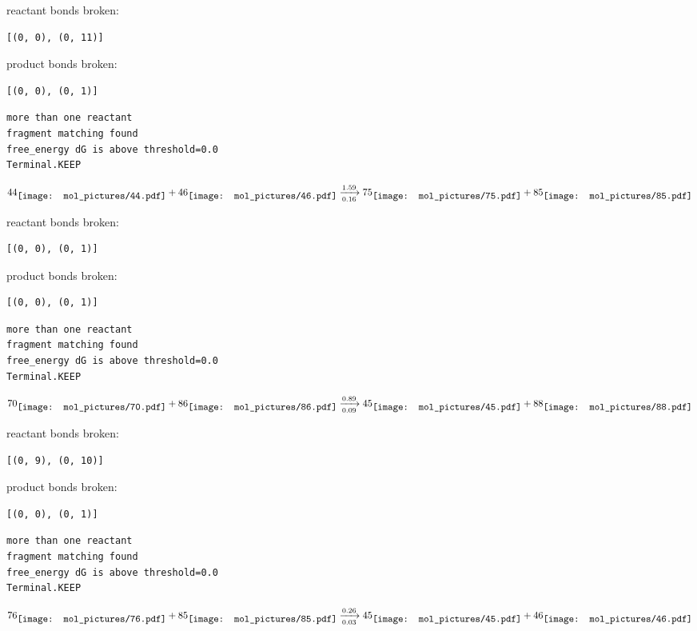\documentclass{article}
\begin{document}
reactant bonds broken:\begin{verbatim}
[(0, 0), (0, 11)]
\end{verbatim}
product bonds broken:\begin{verbatim}
[(0, 0), (0, 1)]
\end{verbatim}




\vspace{1cm}
\begin{verbatim}
more than one reactant
fragment matching found
free_energy dG is above threshold=0.0
Terminal.KEEP
\end{verbatim}
$$
44
\raisebox{-.5\height}{\texttt{[image: mol\_pictures/44.pdf]}}
+
46
\raisebox{-.5\height}{\texttt{[image: mol\_pictures/46.pdf]}}
\xrightarrow[0.16]{1.59}
75
\raisebox{-.5\height}{\texttt{[image: mol\_pictures/75.pdf]}}
+
85
\raisebox{-.5\height}{\texttt{[image: mol\_pictures/85.pdf]}}
$$


reactant bonds broken:\begin{verbatim}
[(0, 0), (0, 1)]
\end{verbatim}
product bonds broken:\begin{verbatim}
[(0, 0), (0, 1)]
\end{verbatim}




\vspace{1cm}
\begin{verbatim}
more than one reactant
fragment matching found
free_energy dG is above threshold=0.0
Terminal.KEEP
\end{verbatim}
$$
70
\raisebox{-.5\height}{\texttt{[image: mol\_pictures/70.pdf]}}
+
86
\raisebox{-.5\height}{\texttt{[image: mol\_pictures/86.pdf]}}
\xrightarrow[0.09]{0.89}
45
\raisebox{-.5\height}{\texttt{[image: mol\_pictures/45.pdf]}}
+
88
\raisebox{-.5\height}{\texttt{[image: mol\_pictures/88.pdf]}}
$$


reactant bonds broken:\begin{verbatim}
[(0, 9), (0, 10)]
\end{verbatim}
product bonds broken:\begin{verbatim}
[(0, 0), (0, 1)]
\end{verbatim}




\vspace{1cm}
\begin{verbatim}
more than one reactant
fragment matching found
free_energy dG is above threshold=0.0
Terminal.KEEP
\end{verbatim}
$$
76
\raisebox{-.5\height}{\texttt{[image: mol\_pictures/76.pdf]}}
+
85
\raisebox{-.5\height}{\texttt{[image: mol\_pictures/85.pdf]}}
\xrightarrow[0.03]{0.26}
45
\raisebox{-.5\height}{\texttt{[image: mol\_pictures/45.pdf]}}
+
46
\raisebox{-.5\height}{\texttt{[image: mol\_pictures/46.pdf]}}
$$
\end{document}

